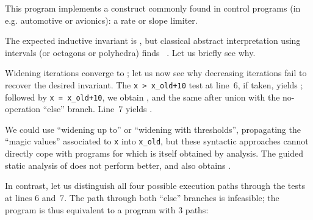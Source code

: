 \begin{minipage}{9cm}

\end{minipage}\begin{minipage}[c]{2cm}
\end{minipage} 

This program implements a construct commonly found in control programs (in e.g.
automotive or avionics): a rate or slope limiter.

The expected inductive invariant is , but classical abstract interpretation using intervals (or octagons or polyhedra) finds ~\cite{ASTREE_ESOP05}.
Let us briefly see why.

Widening iterations converge to ; let us now see why decreasing iterations fail to recover the desired invariant.
The \lstinline|x > x_old+10| test at line~6, if taken, yields ; followed by \lstinline|x = x_old+10|, we obtain
, and the same after union with the no-operation ``else'' branch. Line~7 yields .

We could use ``widening up to'' or ``widening with thresholds'', propagating the ``magic values''  associated to \lstinline|x| into \mbox{\lstinline|x_old|,} but these syntactic approaches cannot directly cope with programs for which  is itself obtained by analysis.
The guided static analysis of \cite{DBLP:conf/sas/GopanR07} does not perform
better, and also obtains .

In contrast, let us distinguish all four possible execution paths through the tests at lines 6 and~7. The path through both ``else'' branches is infeasible; the program is thus equivalent to a program with 3 paths:

